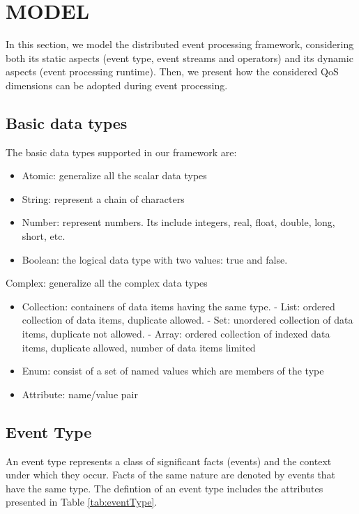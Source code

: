 \documentclass[a4paper,twoside]{article}
\begin{document}
\section{\uppercase{Model}}
\label{sec:model}
In this section, we model the distributed event processing framework, considering both its static aspects (event type, event streams and operators) and its dynamic aspects (event processing runtime). Then, we present how the considered QoS dimensions can be adopted during event processing. %
\subsection{Basic data types}
The basic data types supported in our framework are:
\begin{itemize}
\item Atomic: generalize all the scalar data types
\item String: represent a chain of characters
\item Number: represent numbers. Its include integers, real, float, double, long, short, etc.  
\item Boolean: the logical data type with two values: true and false.
\end{itemize}
Complex: generalize all the complex data types
\begin{itemize}
\item Collection: containers of data items having the same type.
\subitem - List: ordered collection of data items, duplicate allowed.
\subitem - Set: unordered collection of data items, duplicate not allowed.
\subitem - Array: ordered collection of indexed data items,  duplicate allowed,  number of data items limited
\item Enum: consist of a set of named values which are members of the type
\item Attribute: name/value pair
\end{itemize}
\subsection{Event Type}
An event type represents a class of significant facts (events) and the context under which they occur. Facts of the same nature are denoted by events that have the same type. The defintion of an event type includes the attributes presented in Table \ref{tab:eventType}.
\end{document}
